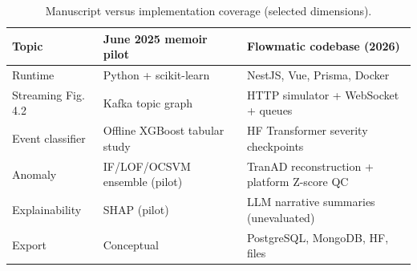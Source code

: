 \begin{table}[H]
  \centering
  \caption{Manuscript versus implementation coverage (selected dimensions).}
  \label{tab:gap-analysis}
  \small
  \begin{tabular}{@{}p{3.2cm}p{4.8cm}p{4.8cm}@{}}
    \toprule
    \textbf{Topic} & \textbf{June 2025 memoir pilot} & \textbf{Flowmatic codebase (2026)} \\
    \midrule
    Runtime & Python + scikit-learn & NestJS, Vue, Prisma, Docker \\
    Streaming Fig.\,4.2 & Kafka topic graph & HTTP simulator + WebSocket + queues \\
    Event classifier & Offline XGBoost tabular study & HF Transformer severity checkpoints \\
    Anomaly & IF/LOF/OCSVM ensemble (pilot) & TranAD reconstruction + platform Z-score QC \\
    Explainability & SHAP (pilot) & LLM narrative summaries (unevaluated) \\
    Export & Conceptual & PostgreSQL, MongoDB, HF, files \\
    \bottomrule
  \end{tabular}
\end{table}
